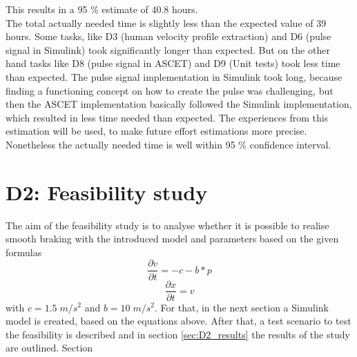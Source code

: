 This results in a 95 \% estimate of 40.8 hours.\\
The total actually needed time is slightly less than the expected value of 39 hours.
Some tasks, like D3 (human velocity profile extraction) and D6 (pulse signal in Simulink) took significantly longer than expected.
But on the other hand tasks like D8 (pulse signal in ASCET) and D9 (Unit tests) took less time than expected.
The pulse signal implementation in Simulink took long, because finding a functioning concept on how to create the pulse was challenging, but then the ASCET implementation basically followed the Simulink implementation, which resulted in less time needed than expected.
The experiences from this estimation will be used, to make future effort estimations more precise.\\
Nonetheless the actually needed time is well within 95 \% confidence interval. 



\chapter{D2: Feasibility study}\label{cha:D2}
The aim of the feasibility study is to analyse whether it is possible to realise smooth braking with the introduced model and parameters based on the given formulas
\begin{equation}
	\frac{\partial v}{\partial t} = -c-b*p
\end{equation}
\begin{equation}
	\frac{\partial x}{\partial t} = v
\end{equation}
with $c = 1.5\; m/s^2$ and $b = 10\; m/s^2$.
For that, in the next section a Simulink model is created, based on the equations above.
After that, a test scenario to test the feasibility is described and in section \ref{sec:D2_results} the results of the study are outlined.
Section 
